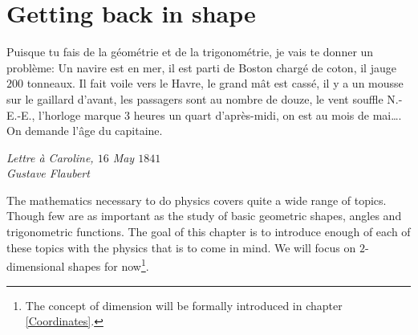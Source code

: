 \chapter{Getting back in shape}

\epigraph{Puisque tu fais de la géométrie et de la trigonométrie, je vais te donner un problème: Un navire est en mer, il est parti de Boston chargé de coton, il jauge $200$ tonneaux. Il fait voile vers le Havre, le grand mât est cassé, il y a un mousse sur le gaillard d’avant, les passagers sont au nombre de douze, le vent souffle N.-E.-E., l’horloge marque $3$ heures un quart d’après-midi, on est au mois de mai…. On demande l’âge du capitaine.}{\textit{Lettre à Caroline, $16$ May $1841$ \\ Gustave Flaubert}}

\noindent The mathematics necessary to do physics covers quite a wide range of topics. Though few are as important as the study of basic geometric shapes, angles and trigonometric functions. The goal of this chapter is to introduce enough of each of these topics with the physics that is to come in mind. We will focus on $2$-dimensional shapes for now\footnote{The concept of dimension will be formally introduced in chapter \ref{Coordinates}.}.\\

